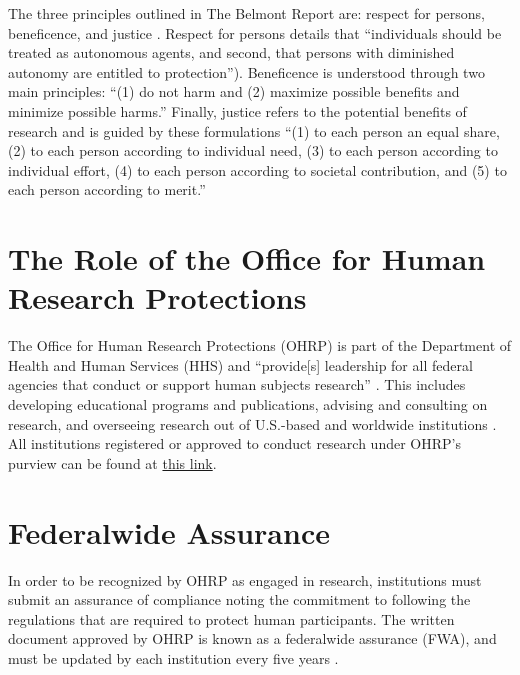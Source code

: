 \documentclass[
  11pt,
]{book}
\begin{document}
The three principles outlined in The Belmont Report are: respect for persons, beneficence, and justice \citep{national_commission_for_the_protection_of_human_subjects_of_biomedical_and_behavioral_research_belmont_1979}. Respect for persons details that ``individuals should be treated as autonomous agents, and second, that persons with diminished autonomy are entitled to protection''). Beneficence is understood through two main principles: ``(1) do not harm and (2) maximize possible benefits and minimize possible harms.'' Finally, justice refers to the potential benefits of research and is guided by these formulations ``(1) to each person an equal share, (2) to each person according to individual need, (3) to each person according to individual effort, (4) to each person according to societal contribution, and (5) to each person according to merit.''

\section{The Role of the Office for Human Research Protections}\label{the-role-of-the-office-for-human-research-protections}

The Office for Human Research Protections (OHRP) is part of the Department of Health and Human Services (HHS) and ``provide{[}s{]} leadership for all federal agencies that conduct or support human subjects research'' \citep{office_for_human_research_protections_about_2016}. This includes developing educational programs and publications, advising and consulting on research, and overseeing research out of U.S.-based and worldwide institutions \citep{office_for_human_research_protections_ohrp_2020}. All institutions registered or approved to conduct research under OHRP's purview can be found at \href{https://ohrp.cit.nih.gov/search/search.aspx?styp=bsc}{this link}.

\section{Federalwide Assurance}\label{federalwide-assurance}

In order to be recognized by OHRP as engaged in research, institutions must submit an assurance of compliance noting the commitment to following the regulations that are required to protect human participants. The written document approved by OHRP is known as a federalwide assurance (FWA), and must be updated by each institution every five years \citep{office_for_human_research_protections_federalwide_2017}.
\end{document}

